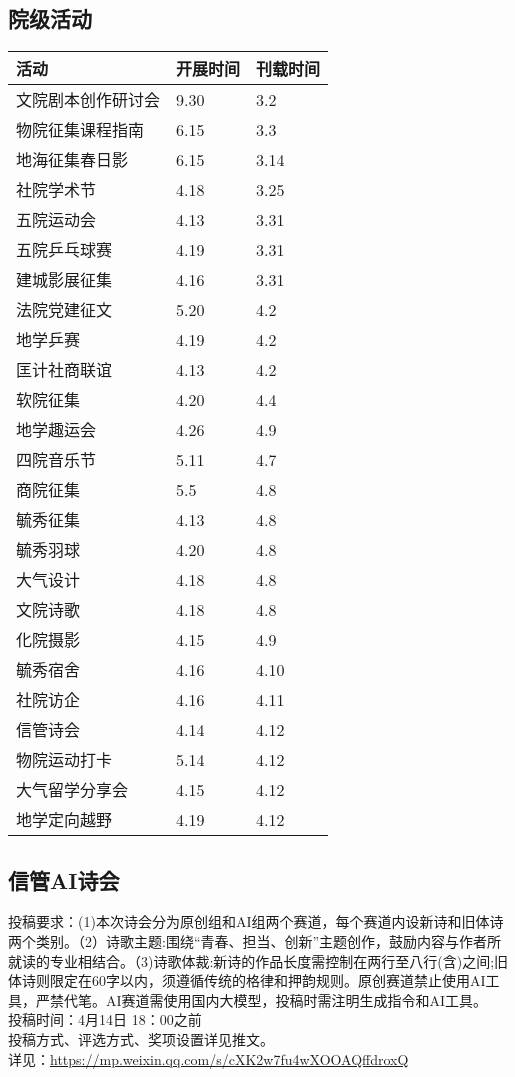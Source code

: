 \documentclass[letterpaper, 12pt]{article}
\begin{document}
\begin{multicols}{2}
\section{院级活动}
\begin{tabular}{|>{\centering\arraybackslash}m{}|m{}|m{}|}
\hline
    活动 & 开展时间 & 刊载时间\\
    \hline\hline
    文院剧本创作研讨会 & 9.30 & 3.2\\
    物院征集课程指南 & 6.15 & 3.3\\
    地海征集春日影 & 6.15 & 3.14\\
    社院学术节 & 4.18 & 3.25\\
    五院运动会 & 4.13 & 3.31\\
    五院乒乓球赛 & 4.19 & 3.31\\
    建城影展征集 & 4.16 & 3.31\\
    法院党建征文 & 5.20 & 4.2\\
    地学乒赛 & 4.19 & 4.2\\
    匡计社商联谊 & 4.13 & 4.2\\
    软院征集 & 4.20 & 4.4\\
    地学趣运会 & 4.26 & 4.9\\
    四院音乐节 & 5.11 & 4.7\\
    商院征集 & 5.5 & 4.8\\
    毓秀征集 & 4.13 & 4.8\\
    毓秀羽球 & 4.20 & 4.8\\
    大气设计 & 4.18 & 4.8\\
    文院诗歌 & 4.18 & 4.8\\
    化院摄影 & 4.15 & 4.9\\
    毓秀宿舍 & 4.16 & 4.10\\
    社院访企 & 4.16 & 4.11\\
    信管诗会 & 4.14 & 4.12\\
    物院运动打卡 & 5.14 & 4.12\\
    大气留学分享会 & 4.15 & 4.12\\
    地学定向越野 & 4.19 & 4.12\\
    \hline
\end{tabular}

\subsection{信管AI诗会}
投稿要求：(1)本次诗会分为原创组和AI组两个赛道，每个赛道内设新诗和旧体诗两个类别。（2）诗歌主题:围绕“青春、担当、创新”主题创作，鼓励内容与作者所就读的专业相结合。（3)诗歌体裁:新诗的作品长度需控制在两行至八行(含)之间;旧体诗则限定在60字以内，须遵循传统的格律和押韵规则。原创赛道禁止使用AI工具，严禁代笔。AI赛道需使用国内大模型，投稿时需注明生成指令和AI工具。
\\投稿时间：4月14日 18：00之前
\\投稿方式、评选方式、奖项设置详见推文。
\\详见：\url{https://mp.weixin.qq.com/s/cXK2w7fu4wXOOAQffdroxQ}


\end{multicols}
\end{document}
